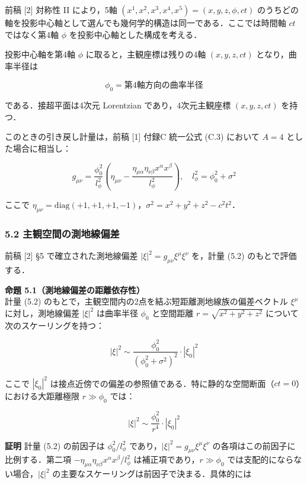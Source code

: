 \documentclass[a4paper,11pt]{ltjsarticle}
\theoremstyle{definition}
\begin{document}
前稿 {[}2{]} 対称性 II により，5軸 \((x^1, x^2, x^3, x^4, x^5) = (x, y, z, \phi, ct)\) のうちどの軸を投影中心軸として選んでも幾何学的構造は同一である．ここでは時間軸 \(ct\) ではなく第4軸 \(\phi\) を投影中心軸とした構成を考える．

投影中心軸を第4軸 \(\phi\) に取ると，主観座標は残りの4軸 \((x, y, z, ct)\) となり，曲率半径は

\[\phi_0 = \text{第4軸方向の曲率半径} \tag{5.1}\]

である．接超平面は4次元 Lorentzian であり，4次元主観座標 \((x, y, z, ct)\) を持つ．

このときの引き戻し計量は，前稿 {[}1{]} 付録C 統一公式 (C.3) において \(A = 4\) とした場合に相当し：

\[g_{\mu\nu} = \frac{\phi_0^2}{l_\phi^2}\left(\eta_{\mu\nu} - \frac{\eta_{\mu\alpha}\eta_{\nu\beta} x^\alpha x^\beta}{l_\phi^2}\right), \quad l_\phi^2 = \phi_0^2 + \sigma^2 \tag{5.2}\]

ここで \(\eta_{\mu\nu} = \text{diag}(+1,+1,+1,-1)\)，\(\sigma^2 = x^2 + y^2 + z^2 - c^2 t^2\)．

\subsubsection{5.2 主観空間の測地線偏差}\label{ux4e3bux89b3ux7a7aux9593ux306eux6e2cux5730ux7ddaux504fux5dee}

前稿 {[}2{]} §5 で確立された測地線偏差 \(|\xi|^2 = g_{\mu\nu}\xi^\mu\xi^\nu\) を，計量 (5.2) のもとで評価する．

\textbf{命題 5.1（測地線偏差の距離依存性）}\\
計量 (5.2) のもとで，主観空間内の2点を結ぶ短距離測地線族の偏差ベクトル \(\xi^\mu\) に対し，測地線偏差 \(|\xi|^2\) は曲率半径 \(\phi_0\) と空間距離 \(r = \sqrt{x^2+y^2+z^2}\) について次のスケーリングを持つ：

\[|\xi|^2 \sim \frac{\phi_0^2}{(\phi_0^2 + \sigma^2)^2} \cdot |\xi_0|^2 \tag{5.3}\]

ここで \(|\xi_0|^2\) は接点近傍での偏差の参照値である．特に静的な空間断面（\(ct = 0\)）における大距離極限 \(r \gg \phi_0\) では：

\[|\xi|^2 \sim \frac{\phi_0^2}{r^4} \cdot |\xi_0|^2 \tag{5.4}\]

\textbf{証明} 計量 (5.2) の前因子は \(\phi_0^2/l_\phi^2\) であり，\(|\xi|^2 = g_{\mu\nu}\xi^\mu\xi^\nu\) の各項はこの前因子に比例する．第二項 \(-\eta_{\mu\alpha}\eta_{\nu\beta}x^\alpha x^\beta/l_\phi^2\) は補正項であり，\(r \gg \phi_0\) では支配的にならない場合，\(|\xi|^2\) の主要なスケーリングは前因子で決まる．具体的には
\end{document}
